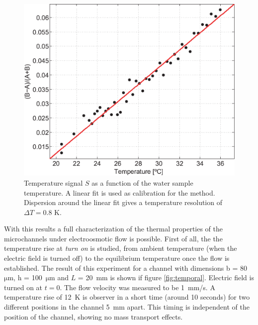 \documentclass[twocolumn]{svjour3}       %
\begin{document}
\begin{figure}[h!]
\centering
\includegraphics[width=\columnwidth]{figs/calib.eps}
\caption{Temperature signal $S$ as a function of the water sample temperature. A linear fit is used as calibration for the method. Dispersion around the linear fit gives a temperature resolution of $\Delta T = 0.8$ K.\label{fig:calib}}
\end{figure}

With this results a full characterization of the thermal properties of the microchannels under electroosmotic flow is possible. First of all, the the temperature rise at \textit{turn on} is studied, from ambient temperature (when the electric field is turned off) to the equilibrium temperature once the flow is established. The result of this experiment for a channel with dimensions b = 80~$\mathrm{\mu m}$, h = 100~$\mathrm{\mu m}$ and $L$ = 20~mm is shown if figure \ref{fig:temporal}. Electric field is turned on at $t = 0$. The flow velocity was measured to be 1~mm/s. A temperature rise of 12~K is observer in a short time (around 10 seconds) for two different positions in the channel 5~mm apart. This timing is independent of the position of the channel, showing no mass transport effects.
\end{document}
